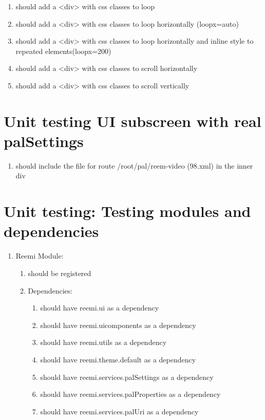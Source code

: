 \begin{singlespace}
\begin{enumerate}
\begin{enumerate}
\item         should add a <div> with css classes to loop
\item         should add a <div> with css classes to loop horizontally (loopx=auto)
\item         should add a <div> with css classes to loop horizontally and inline style to repeated elements(loopx=200)
\item         should add a <div> with css classes to scroll horizontally
\item         should add a <div> with css classes to scroll vertically
\end{enumerate}
\end{enumerate}

\section{Unit testing UI subscreen with real palSettings}
\begin{enumerate}
\item     should include the file for route /root/pal/reem-video (98.xml) in the inner div
\end{enumerate}

\section{Unit testing: Testing modules and dependencies}
\begin{enumerate}
\item     Reemi Module:
\begin{enumerate}
\item         should be registered
\item         Dependencies:
\begin{enumerate}
\item             should have reemi.ui as a dependency
\item             should have reemi.uicomponents as a dependency
\item             should have reemi.utils as a dependency
\item             should have reemi.theme.default as a dependency
\item             should have reemi.services.palSettings as a dependency
\item             should have reemi.services.palProperties as a dependency
\item             should have reemi.services.palUri as a dependency
\end{enumerate}
\end{enumerate}
\end{enumerate}


\end{singlespace}
